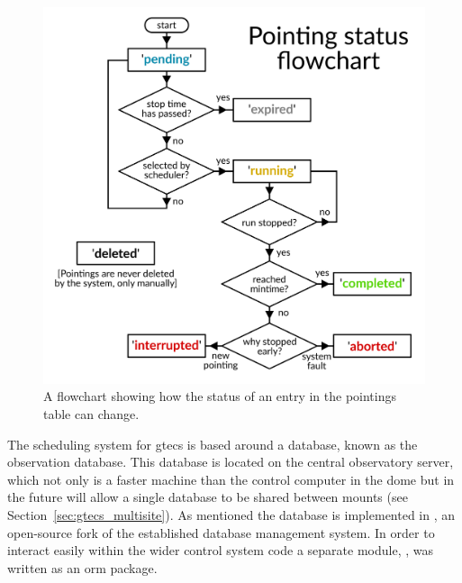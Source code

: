 \begin{colsection}
\begin{colsection}
\begin{figure}[p]
\begin{center}
\includegraphics[width=0.9\linewidth]{images/pointings.pdf}
\end{center}
\caption[Pointings]{A flowchart showing how the status of an entry in the pointings table can change.}
\label{fig:pointings}
\end{figure}

The scheduling system for \gls{gtecs} is based around a  database, known as the observation database. This database is located on the central observatory server, which not only is a faster machine than the control computer in the dome but in the future will allow a single database to be shared between mounts (see Section~\ref{sec:gtecs_multisite}). As mentioned the database is implemented in , an open-source fork of the established  database management system. In order to interact easily within the wider control system code a separate  module, , was written as an \gls{orm} package.


\end{colsection}
\end{colsection}
